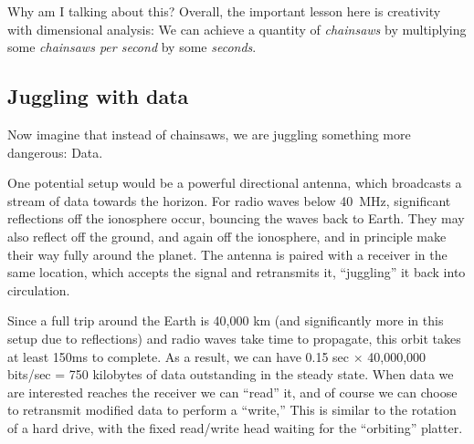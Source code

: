 \documentclass[twocolumn]{article}
\newcommand\sfrac[2]{\!{}\,^{#1}\!/{}\!_{#2}}
\begin{document}
Why am I talking about this? Overall, the important lesson here is
creativity with dimensional analysis: We can achieve a quantity of
{\it chainsaws} by multiplying some {\it chainsaws per second} by some
{\it seconds}.


% 

% 
% 
% 
% 
\subsection{Juggling with data}

Now imagine that instead of chainsaws, we are juggling something more
dangerous: Data.

One potential setup would be a powerful directional antenna, which
broadcasts a stream of data towards the horizon. For radio waves below
40~MHz, significant reflections off the ionosphere occur, bouncing the
waves back to Earth. They may also reflect off the ground, and again
off the ionosphere, and in principle make their way fully around the
planet. The antenna is paired with a receiver in the same location,
which accepts the signal and retransmits it, ``juggling'' it back into
circulation.

Since a full trip around the Earth is 40,000 km (and significantly
more in this setup due to reflections) and radio waves take time to
propagate, this orbit takes at least 150ms to
complete. As a result, we can have 0.15 sec $\times$ 40,000,000
bits/sec = 750 kilobytes of data outstanding in the steady state. When
data we are interested reaches the receiver we can ``read'' it, and of
course we can choose to retransmit modified data to perform a
``write,'' This is similar to the rotation of a hard drive, with the
fixed read/write head waiting for the ``orbiting'' platter.
\end{document}
